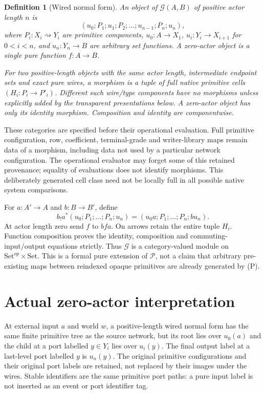 \documentclass[11pt]{article}
\newtheorem{definition}{Definition}\newtheorem{theorem}[definition]{Theorem}\newtheorem{proposition}[definition]{Proposition}
\begin{document}
\begin{definition}[Wired normal form]
An object of $\mathcal G(A,B)$ of positive actor length $n$ is
\[
 (u_0;P_1;u_1;P_2;\ldots;u_{n-1};P_n;u_n),             \tag{W}
\]
where $P_i:X_i\rightsquigarrow Y_i$ are primitive components,
$u_0:A\to X_1$, $u_i:Y_i\to X_{i+1}$ for $0<i<n$, and $u_n:Y_n\to B$ are arbitrary set functions. A zero-actor object is a single pure function $f:A\to B$.

For two positive-length objects with the same actor length, intermediate endpoint sets and exact pure wires, a morphism is a tuple of full native primitive cells $(H_i:P_i\to P'_i)$. Different such wire/type components have no morphisms unless explicitly added by the transparent presentations below. A zero-actor object has only its identity morphism. Composition and identity are componentwise.
\end{definition}
These categories are specified before their operational evaluation. Full primitive configuration, row, coefficient, terminal-grade and writer-library maps remain data of a morphism, including data not used by a particular network configuration. The operational evaluator may forget some of this retained provenance; equality of evaluations does not identify morphisms. This deliberately generated cell class need not be locally full in all possible native system comparisons.

For $a:A'\to A$ and $b:B\to B'$, define
\[
 b_!a^*(u_0;P_1;\ldots;P_n;u_n)
   =(u_0a;P_1;\ldots;P_n;bu_n).                         \tag{P}
\]
At actor length zero send $f$ to $bfa$. On arrows retain the entire tuple $H_i$. Function composition proves the identity, composition and commuting-input/output equations strictly. Thus $\mathcal G$ is a category-valued module on $\mathrm{Set}^{op}\times\mathrm{Set}$. This is a formal pure extension of $\mathcal P$, not a claim that arbitrary pre-existing maps between reindexed opaque primitives are already generated by (P).

\section{Actual zero-actor interpretation}
At external input $a$ and world $w$, a positive-length wired normal form has the same finite primitive tree as the source network, but its root lies over $u_0(a)$ and the child at a port labelled $y\in Y_i$ lies over $u_i(y)$. The final output label at a last-level port labelled $y$ is $u_n(y)$. The original primitive configurations and their original port labels are retained, not replaced by their images under the wires. Stable identifiers are the same primitive port paths: a pure input label is not inserted as an event or port identifier tag.
\end{document}
